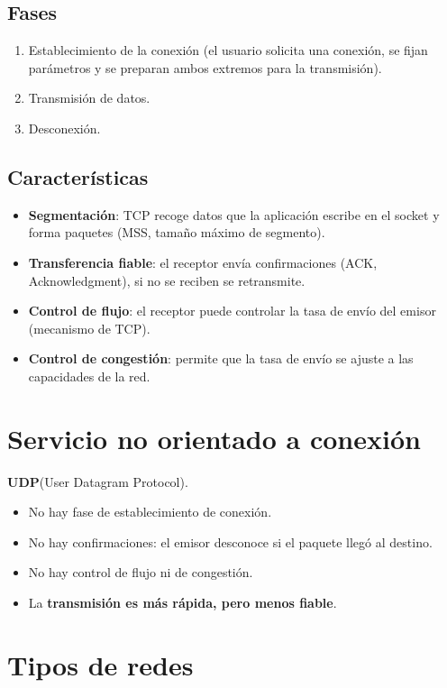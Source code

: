 \documentclass{article}
\begin{document}
\subsection{Fases}
\begin{enumerate}
    \item Establecimiento de la conexión (el usuario solicita una conexión, se fijan parámetros y se preparan ambos extremos para la transmisión).
    \item Transmisión de datos.
    \item Desconexión.
\end{enumerate}

\subsection{Características}
\begin{itemize}
    \item \textbf{Segmentación}: TCP recoge datos que la aplicación escribe en el socket y forma paquetes (MSS, tamaño máximo de segmento).
    \item \textbf{Transferencia fiable}: el receptor envía confirmaciones (ACK, Acknowledgment), si no se reciben se retransmite.
    \item \textbf{Control de flujo}: el receptor puede controlar la tasa de envío del emisor (mecanismo de TCP).
    \item \textbf{Control de congestión}: permite que la tasa de envío se ajuste a las capacidades de la red.
\end{itemize}

\section{Servicio no orientado a conexión}
\textbf{UDP}(User Datagram Protocol).
\begin{itemize}
    \item No hay fase de establecimiento de conexión.
    \item No hay confirmaciones: el emisor desconoce si el paquete llegó al destino.
    \item No hay control de flujo ni de congestión.
    \item La \textbf{transmisión es más rápida, pero menos fiable}.
\end{itemize}

\section{Tipos de redes}
\end{document}
